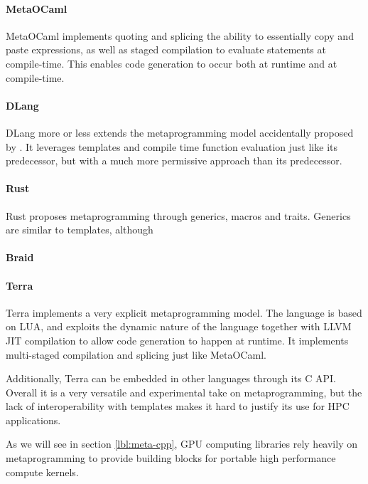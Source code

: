 \documentclass[../main]{subfiles}
\begin{document}
\paragraph{MetaOCaml}

MetaOCaml\cite{metaocaml} implements quoting and splicing
\ie the ability to essentially copy and paste expressions,
as well as staged compilation to evaluate statements at compile-time.
This enables code generation to occur both at runtime and at compile-time.

\paragraph{DLang}

DLang more or less extends the metaprogramming model accidentally proposed
by \cpp. It leverages templates and compile time function evaluation just like
its predecessor, but with a much more permissive approach than its predecessor.


\paragraph{Rust}

Rust proposes metaprogramming through generics, macros and traits.
Generics are similar to \cpp templates, although

\paragraph{Braid}

\paragraph{Terra}

Terra\cite{terra} implements a very explicit metaprogramming model.
The language is based on LUA, and exploits the dynamic nature of the language
together with LLVM JIT compilation to allow code generation
to happen at runtime.
It implements multi-staged compilation and splicing just like MetaOCaml.

Additionally, Terra can be embedded in other languages through its C API.
Overall it is a very versatile and experimental take on metaprogramming,
but the lack of interoperability with \cpp templates makes it hard to justify
its use for HPC applications.

As we will see in section \ref{lbl:meta-cpp}, GPU computing libraries
rely heavily on \cpp metaprogramming to provide building blocks for
portable high performance compute kernels.
\end{document}
